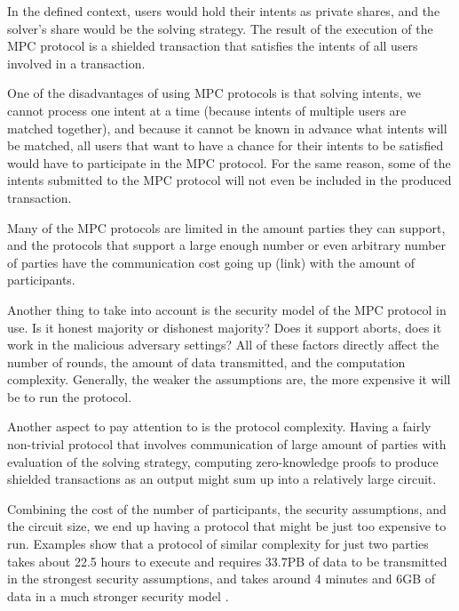 \documentclass[
    9pt,            %
    report,        %
    affiltop,       %
]{art}
\begin{document}
In the defined context, users would hold their intents as private shares, and the solver's share would be the solving strategy. The result of the execution of the MPC protocol is a shielded transaction that satisfies the intents of all users involved in a transaction.

\hfill

One of the disadvantages of using MPC protocols is that solving intents, we cannot process one intent at a time (because intents of multiple users are matched together), and because it cannot be known in advance what intents will be matched, all users that want to have a chance for their intents to be satisfied would have to participate in the MPC protocol. For the same reason, some of the intents submitted to the MPC protocol will not even be included in the produced transaction.

Many of the MPC protocols are limited in the amount parties they can support, and the protocols that support a large enough number or even arbitrary number of parties have the communication cost going up (link) with the amount of participants.

\hfill

Another thing to take into account is the security model of the MPC protocol in use. Is it honest majority or dishonest majority? Does it support aborts, does it work in the malicious adversary settings? All of these factors directly affect the number of rounds, the amount of data transmitted, and the computation complexity. Generally, the weaker the assumptions are, the more expensive it will be to run the protocol.

\hfill

Another aspect to pay attention to is the protocol complexity. Having a fairly non-trivial protocol that involves communication of large amount of parties with evaluation of the solving strategy, computing zero-knowledge proofs to produce shielded transactions as an output might sum up into a relatively large circuit.

\hfill

Combining the cost of the number of participants, the security assumptions, and the circuit size, we end up having a protocol that might be just too expensive to run. Examples show that a protocol of similar complexity for just two parties takes about 22.5 hours to execute and requires 33.7PB of data to be transmitted in the strongest security assumptions, and takes around 4 minutes and 6GB of data in a much stronger security model \cite{flash}.
\end{document}
